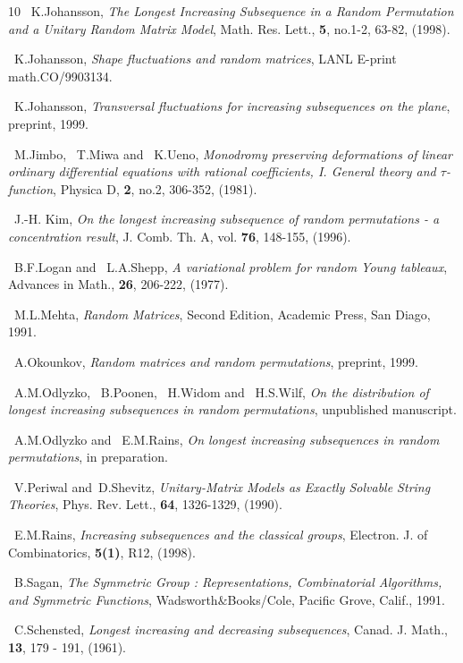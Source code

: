 \documentclass{amsart}
\theoremstyle{definition}
\theoremstyle{remark}
\numberwithin{equation}{section}
\begin{document}
\begin{thebibliography}{10}
~K.Johansson, \emph{The Longest Increasing Subsequence in 
a Random Permutation and a Unitary Random Matrix Model}, 
Math. Res. Lett., \textbf{5}, no.1-2, 63-82, (1998).

~K.Johansson, \emph{Shape fluctuations and random matrices}, 
LANL E-print math.CO/9903134.

~K.Johansson, \emph{Transversal fluctuations for increasing subsequences 
on the plane}, preprint, 1999.

~M.Jimbo, ~T.Miwa and ~K.Ueno, \emph{Monodromy preserving deformations 
of linear ordinary differential equations with rational coefficients, I. 
General theory and $\tau$-function}, 
Physica D, \textbf{2}, no.2, 306-352, (1981).

~J.-H. Kim, \emph{On the longest increasing subsequence of random
permutations - a concentration result}, J. Comb. Th. A, vol. \textbf{76},
148-155, (1996).

~B.F.Logan and ~L.A.Shepp, \emph{A variational problem
for random Young tableaux}, Advances in Math., \textbf{26},
206-222, (1977).

~M.L.Mehta, \emph{Random Matrices}, Second Edition, Academic Press, 
San Diago, 1991.

~A.Okounkov, \emph{Random matrices and random permutations},
preprint, 1999.

~A.M.Odlyzko, ~B.Poonen, ~H.Widom and ~H.S.Wilf, \emph{On the
distribution of longest increasing subsequences in random permutations},
unpublished manuscript.

~A.M.Odlyzko and ~E.M.Rains, \emph{On longest increasing subsequences 
in random permutations}, in preparation.

~V.Periwal and~D.Shevitz, \emph{Unitary-Matrix Models as Exactly Solvable 
String Theories}, Phys. Rev. Lett., {\bf 64}, 1326-1329, (1990).

~E.M.Rains, \emph{Increasing subsequences and the classical groups},
Electron. J. of Combinatorics, {\bf 5(1)}, R12, (1998).

~B.Sagan, \emph{The Symmetric Group : Representations, Combinatorial 
Algorithms, and Symmetric Functions}, Wadsworth$\&$Books/Cole, 
Pacific Grove, Calif., 1991.

~C.Schensted, \emph{Longest increasing and decreasing subsequences},
Canad. J. Math., {\bf 13}, 179 - 191, (1961).


\end{thebibliography}
\end{document}
